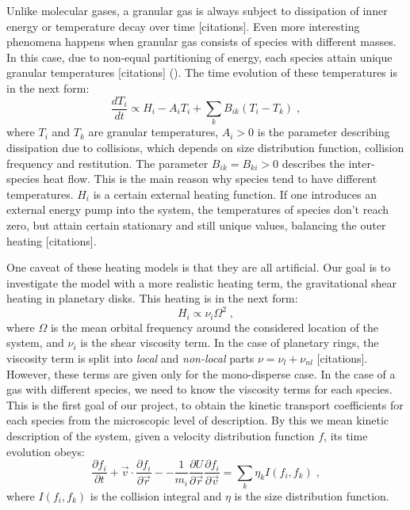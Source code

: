 \documentclass[11pt, notitlepage]{article} %
\begin{document}
Unlike molecular gases, a granular gas is always subject to dissipation of inner 
energy or temperature decay over time [citations]. Even more interesting phenomena
happens when granular gas consists of species with different masses. In this case, 
due to non-equal partitioning of energy, each species attain unique granular 
temperatures [citations] (\cite{Brilliantov2013,Spahn2011}). 
The time evolution of these temperatures is in the next form:
\begin{equation}
	\frac{dT_i}{dt} \propto H_i -A_iT_i+\sum_{k}B_{ik}(T_i-T_k)\;,
\end{equation}
where $T_i$ and $T_k$ are granular temperatures, $A_i>0$ is the parameter describing 
dissipation due to collisions, which depends on size distribution function, collision 
frequency and restitution. The parameter $B_{ik}=B_{ki}>0$ describes the inter-species 
heat flow. This is the main reason why species tend to have different temperatures. 
$H_i$ is a certain external heating function. If one introduces an external energy pump 
into the system, the temperatures of species don't reach zero, but attain certain 
stationary and still unique values, balancing the outer heating [citations]. 

One caveat of these heating models is that they are all artificial. Our goal 
is to investigate the model with a more realistic heating term, the gravitational 
shear heating in planetary disks. This heating is in the next form:
\begin{equation}
	H_i \propto \nu_i\Omega^2\;,
\end{equation}
where $\Omega$ is the mean orbital frequency around the considered location of the system,
and $\nu_i$ is the shear viscosity term. In the case of planetary rings, the viscosity
term is split into \emph{local} and \emph{non-local} parts $\nu=\nu_l+\nu_{nl}$ [citations].
However, these terms are given only for the mono-disperse case. In the case of a gas 
with different species, we need to know the viscosity terms for each species. 
This is the first goal of our project, to obtain the kinetic transport coefficients
for each species from the microscopic level of description. 
By this we mean kinetic description of the system, given a velocity distribution 
function $f$, its time evolution obeys:
\begin{equation}
	\frac{\partial f_i}{\partial t}+\vec{v}\cdot\frac{\partial f_i}{\partial\vec{r}}-
	-\frac{1}{m_i}\frac{\partial U}{\partial\vec{r}}\frac{\partial f_i}{\partial\vec{v}}=
	\sum_k\eta_kI(f_i,f_k)\;,
\end{equation}
where $I(f_i, f_k)$ is the collision integral and $\eta$ is the size distribution 
function.
\end{document}
